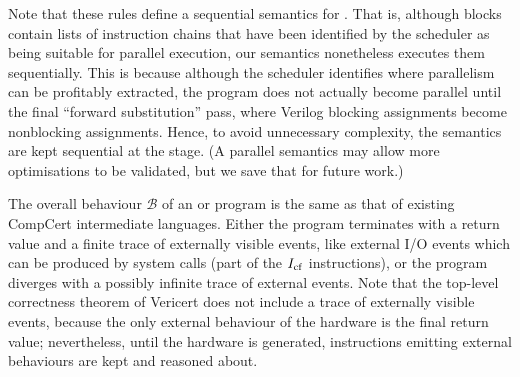 Note that these rules define a sequential semantics for \rtlpar{}. That is,
although \rtlpar{} blocks contain lists of instruction chains that have been
identified by the scheduler as being suitable for parallel execution, our
semantics nonetheless executes them sequentially. This is because although the
scheduler identifies where parallelism can be profitably extracted, the program
does not actually become parallel until the final \enquote{forward substitution}
pass, where Verilog blocking assignments become nonblocking assignments. Hence,
to avoid unnecessary complexity, the semantics are kept sequential at the
\rtlpar{} stage. (A parallel \rtlpar{} semantics may allow more optimisations to
be validated, but we save that for future work.)

The overall behaviour $\mathcal{B}$ of an \rtlblock{} or \rtlpar{} program is the same as that of existing CompCert intermediate languages.  Either the program terminates with a return value and a finite trace of externally visible events, like external I/O events which can be produced by system calls (part of the $I_{\mathrm{cf}}$ instructions), or the program diverges with a possibly infinite trace of external events.  Note that the top-level correctness theorem of Vericert does not include a trace of externally visible events, because the only external behaviour of the hardware is the final return value; nevertheless, until the hardware is generated, instructions emitting external behaviours are kept and reasoned about.

\newcommand\cons{\mathbin{::}}

